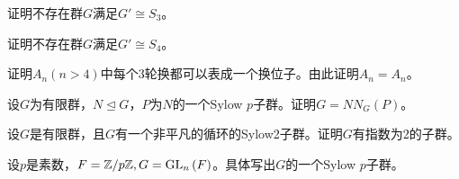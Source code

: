 \begin{prob}
证明不存在群$G$满足$G'\cong S_{3}$。
\end{prob}
\begin{prob}
证明不存在群$G$满足$G'\cong S_{4}$。
\end{prob}
\begin{prob}
证明$A_{n}(n>4)$中每个3轮换都可以表成一个换位子。由此证明$A_{n}=A_{n}$。
\end{prob}
\begin{prob}
设$G$为有限群，$N\trianglelefteq G$，$P$为$N$的一个Sylow $p$子群。证明$G=NN_{G}\left(P\right)$。
\end{prob}
\begin{prob}
设$G$是有限群，且$G$有一个非平凡的循环的Sylow2子群。证明$G$有指数为2的子群。
\end{prob}
\begin{prob}
设$p$是素数，$F=\mathbb{Z}/p\mathbb{Z},G={\rm GL}_{n}\left(F\right)$。具体写出$G$的一个Sylow $p$子群。
\end{prob}
